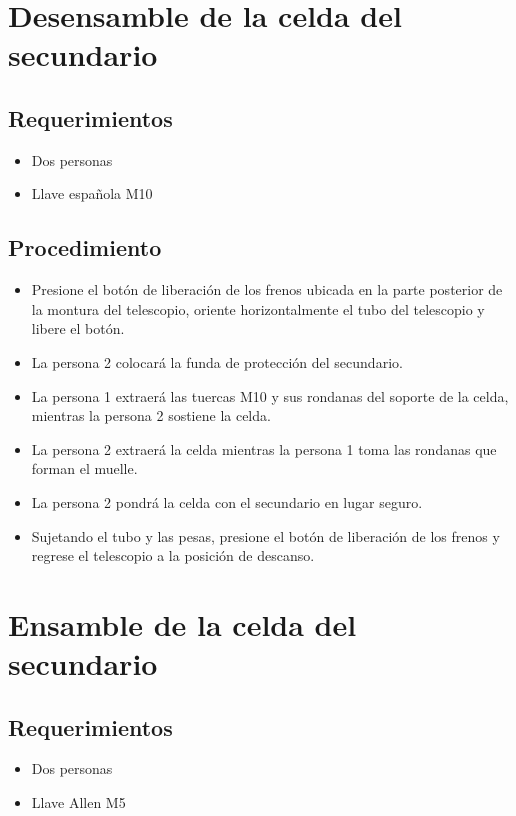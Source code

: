 \section{Desensamble de la celda del secundario }

\subsection{Requerimientos}

\begin{itemize}
\item Dos personas
\item Llave española M10
\end{itemize}

\subsection{Procedimiento}

\begin{itemize}
\item Presione el botón de liberación de los frenos ubicada en la parte posterior de la montura del telescopio, oriente horizontalmente el tubo del telescopio y libere el botón. 
\item La persona 2 colocará la funda de protección del secundario.
\item La persona 1 extraerá las tuercas M10 y sus rondanas del soporte de la celda, mientras la persona 2 sostiene la celda.
\item La persona 2 extraerá la celda mientras la persona 1 toma las rondanas que forman el muelle.
\item La persona 2 pondrá la celda con el secundario en lugar seguro.
\item Sujetando el tubo y las pesas, presione el botón de liberación de los frenos y regrese el telescopio a la posición de descanso. 
\end{itemize}

\section{Ensamble de la celda del secundario}

\subsection{Requerimientos}

\begin{itemize}
\item Dos personas
\item Llave Allen M5
\end{itemize}

